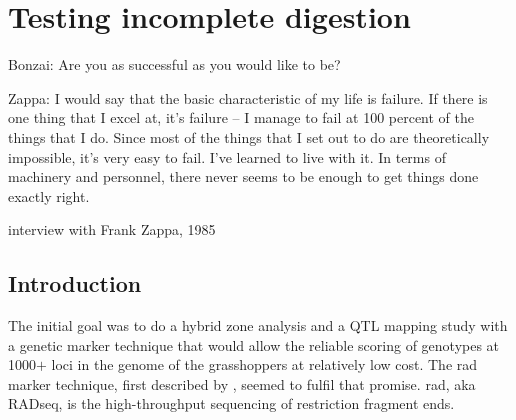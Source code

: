 \documentclass[a4paper,12pt,times,print,index, custombib]{PhDThesisPSnPDF}\usepackage[]{graphicx}\usepackage[]{color}
\begin{document}
\printglossaries

\chapter{Testing incomplete digestion}

\ifpdf
    \graphicspath{
    {./Figs/Raster/}
    {./Figs/PDF/}
    {./Figs/}
    }
\else
    \graphicspath{ 
    {./Figs/Vector/}
    {./Figs/}
    }
\fi



%

\epigraph{
Bonzai: Are you as successful as you would like to be?

Zappa: I would say that the basic characteristic of my life is failure. 
If there is one thing that I excel at, it's failure -- I manage to fail at 100 percent of the things that I do. 
Since most of the things that I set out to do are theoretically impossible, it's very easy to fail. 
I've learned to live with it. 
In terms of machinery and personnel, there never seems to be enough to get things done exactly right.
}{interview with Frank Zappa, 1985}


\section{Introduction}
The initial goal was to do a hybrid zone analysis and a QTL mapping study with a genetic marker technique that would allow the reliable scoring of genotypes at 1000$+$ loci in the genome of the grasshoppers at relatively low cost. The \gls{rad} marker technique, first described by \cite{Baird2008}, seemed to fulfil that promise.  \gls{rad}, aka RADseq, is the high-throughput sequencing of restriction fragment ends. \\
\end{document}
